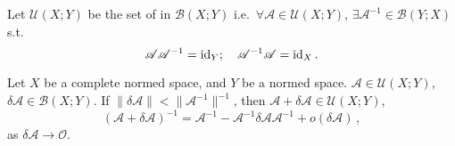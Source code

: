 \documentclass[openany]{book}
\begin{document}
Let $\mathcal U(X; Y)$ be the set of  in $\mathcal B(X; Y)$ i.e.\ $\forall \mathscr A \in \mathscr U(X; Y)$, $\exists \mathscr A^{-1} \in \mathscr B(Y; X)$ s.t.\ 
\begin{equation*}
	\mathscr A \mathscr A^{-1} = \operatorname{id}_Y; 
	\quad
	\mathscr A^{-1} \mathscr A = \operatorname{id}_X.
\end{equation*}

\begin{theorem}
	\label{theorem: differential of reversion}
	Let $X$ be a complete normed space, and $Y$ be a normed space. $\mathscr A \in \mathcal U(X; Y)$, $\delta \mathscr A \in \mathcal B(X; Y)$.
	If $\|\delta \mathscr A\| < \|\mathscr A^{-1}\|^{-1}$, then $\mathscr A + \delta \mathscr A \in \mathcal U(X; Y)$,
	\begin{equation*}
		(\mathscr A + \delta \mathscr A)^{-1} = \mathscr A^{-1} - \mathscr A^{-1}\delta \mathscr A \mathscr A^{-1} + o(\delta \mathscr A)\,,
	\end{equation*}
	as $\delta \mathscr A \to \mathscr O$.
\end{theorem}
\end{document}
